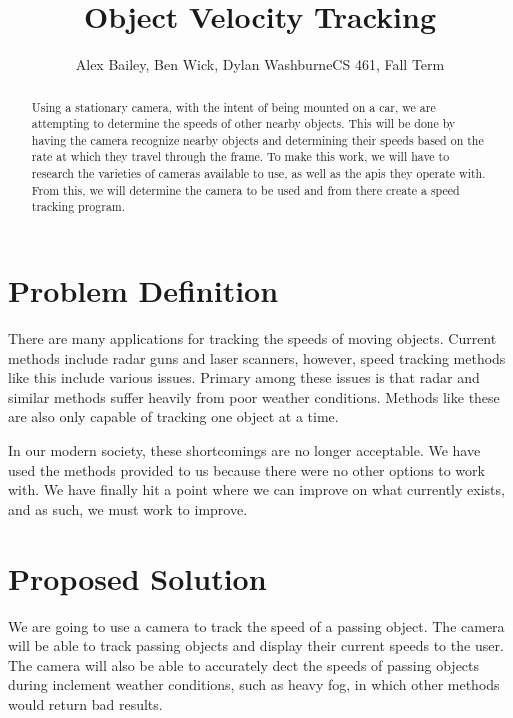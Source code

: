 \documentclass[letterpaper,10pt,onecolumn,draftclsnofoot]{IEEEtran}
\title{Object Velocity Tracking}
\author{Alex Bailey, Ben Wick, Dylan WashburneCS 461, Fall Term}
\begin{document}
\begin{titlepage}

\maketitle

\begin{abstract}
Using a stationary camera, with the intent of being mounted on a car, we are attempting to determine the speeds of other nearby objects.
This will be done by having the camera recognize nearby objects and determining their speeds based on the rate at which they travel through the frame.
To make this work, we will have to research the varieties of cameras available to use, as well as the apis they operate with.
From this, we will determine the camera to be used and from there create a speed tracking program.
\end{abstract}

\end{titlepage}

\section{Problem Definition}

There are many applications for tracking the speeds of moving objects.
Current methods include radar guns and laser scanners, however, speed tracking methods like this include various issues.
Primary among these issues is that radar and similar methods suffer heavily from poor weather conditions.
Methods like these are also only capable of tracking one object at a time.

In our modern society, these shortcomings are no longer acceptable.
We have used the methods provided to us because there were no other options to work with.
We have finally hit a point where we can improve on what currently exists, and as such, we must work to improve.


\section{Proposed Solution}

We are going to use a camera to track the speed of a passing object.
The camera will be able to track passing objects and display their current speeds to the user.
The camera will also be able to accurately dect the speeds of passing objects during inclement weather conditions, such as heavy fog, in which other methods would return bad results.
\end{document}

